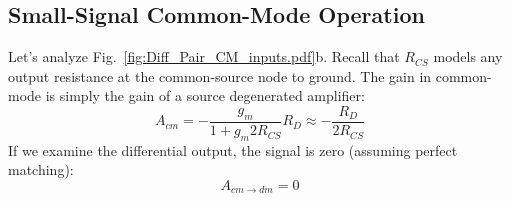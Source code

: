 \subsection{Small-Signal Common-Mode Operation}
Let's analyze Fig.~\ref{fig:Diff_Pair_CM_inputs.pdf}b.  Recall that $R_{CS}$ models any output resistance at the common-source node to ground.   The gain in common-mode is simply the gain of a source degenerated amplifier:
\begin{equation}
	A_{cm} = -\frac{g_m}{1 + g_m 2R_{CS}} R_D \approx -\frac{R_D}{2R_{CS}}
\end{equation}
If we examine the differential output, the signal is zero (assuming perfect matching):
\begin{equation}
	A_{cm \to dm} = 0
\end{equation}
